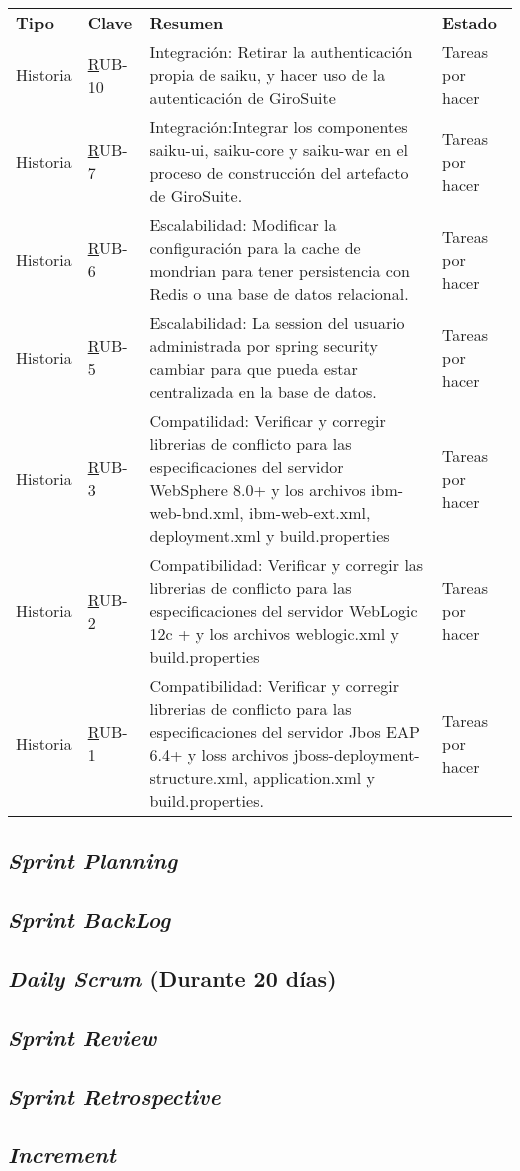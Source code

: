 	\begin{table}[]
		\begin{tabular}{llll}
			\rowcolor[HTML]{C9DAF8} 
			{\color[HTML]{666} \textbf{Tipo}} &
			{\color[HTML]{666} \textbf{Clave}} &
			{\color[HTML]{666} \textbf{Resumen}} &
			{\color[HTML]{666} \textbf{Estado}} \\
			Historia &
			{\color[HTML]{00E} {\ul RUB-10}} &
			Integración: Retirar la authenticación propia de saiku, y hacer uso de la autenticación de GiroSuite &
			Tareas por hacer \\
			Historia &
			{\color[HTML]{00E} {\ul RUB-7}} &
			Integración:Integrar los componentes saiku-ui, saiku-core y saiku-war en el proceso de construcción del artefacto de GiroSuite. &
			Tareas por hacer \\
			Historia &
			{\color[HTML]{00E} {\ul RUB-6}} &
			Escalabilidad: Modificar la configuración para la cache de mondrian para tener persistencia con Redis o una base de datos relacional. &
			Tareas por hacer \\
			Historia &
			{\color[HTML]{00E} {\ul RUB-5}} &
			Escalabilidad:  La session del usuario administrada por spring security cambiar para que pueda estar centralizada en la base de datos. &
			Tareas por hacer \\
			Historia &
			{\color[HTML]{00E} {\ul RUB-3}} &
			Compatilidad: Verificar y corregir librerias de conflicto para las especificaciones del servidor WebSphere 8.0+ y los archivos ibm-web-bnd.xml, ibm-web-ext.xml, deployment.xml y build.properties &
			Tareas por hacer \\
			Historia &
			{\color[HTML]{00E} {\ul RUB-2}} &
			Compatibilidad: Verificar y corregir las librerias de conflicto para las especificaciones del servidor WebLogic 12c + y los archivos weblogic.xml y build.properties &
			Tareas por hacer \\
			Historia &
			{\color[HTML]{00E} {\ul RUB-1}} &
			Compatibilidad: Verificar y corregir librerias de conflicto para las especificaciones del servidor Jbos EAP 6.4+ y loss archivos jboss-deployment-structure.xml, application.xml y build.properties. &
			Tareas por hacer
		\end{tabular}
	\end{table}
	\subsection{\textit{Sprint Planning}}
	\subsection{\textit{Sprint BackLog}}
	\subsection{\textit{Daily Scrum} (Durante 20 d\'{i}as)}
	\subsection{\textit{Sprint Review}}
	\subsection{\textit{Sprint Retrospective}}
	
	\subsection{\textit{Increment}}